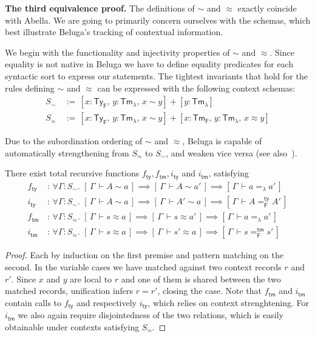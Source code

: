 \documentclass[a4paper,UKenglish]{lipics-v2016}
\newcommand{\ms}{\,}
\newcommand{\mrel}[1]{\mathrel{\ms #1 \ms}}
\newcommand{\OF}{\mrel{:}}
\newcommand{\mAll}[1]{\ensuremath{\forall} #1.\ms\ms}
\newcommand{\eqdef}{\mrel{:=}}
\newcommand{\TyF}{\ensuremath{\mathsf{Ty_{F}}}}
\newcommand{\TmF}{\ensuremath{\mathsf{Tm_{F}}}}
\newcommand{\TmL}{\ensuremath{\mathsf{Tm_{\lambda}}}}
\newcommand{\ty}{\mathsf{ty}}
\newcommand{\tm}{\mathsf{tm}}
\newcommand{\of}{\ensuremath{\!:\!}}
\newcommand{\tyr}{\mathrel{\sim}}
\newcommand{\tmr}{\mathrel{\approx}}
\newcommand{\bc}[2]{\ensuremath{[\,#1\,\vdash #2\,]}}
\newcommand{\sof}{\ensuremath{\!:}}
\newcommand{\ssep}{\ensuremath{,\ms}}
\theoremstyle{plain}
\begin{document}
{\bf The third equivalence proof.}
The definitions of $\tyr$ and $\tmr$ exactly coincide with Abella.
We are going to primarily concern ourselves with the schemas, which best illustrate Beluga's tracking of contextual information.

We begin with the functionality and injectivity properties of $\tyr$ and $\tmr$.
Since equality is not native in Beluga we have to define equality predicates for each syntactic sort to express our statements. The tightest invariants that hold for the rules defining $\tyr$ and $\tmr$ can be expressed with the following context schemas:
\begin{align*}
  S_{\tyr} &\eqdef [x\sof\TyF \ssep y\sof\TmL \ssep x \tyr y] + [y\sof\TmL]\\
  S_{\tmr} &\eqdef [x\sof\TyF \ssep y\sof\TmL \ssep x \tyr y] + [x\sof\TmF \ssep y\sof\TmL \ssep x \tmr y]
\end{align*}

Due to the subordination ordering of $\tyr$ and $\tmr$, Beluga is capable of automatically strengthening from $S_{\tmr}$ to $S_{\tyr}$, and weaken vice versa (see also~\cite{Virga99phd}).
\begin{lemma}
  There exist total recursive functions $f_{\ty}, f_{\tm}, i_{\ty}$ and $i_{\tm}$, satisfying
  \begin{align*}
    f_{\ty} &\OF  \mAll{\Gamma \of S_{\tyr}} \bc{\Gamma}{A \tyr a} \implies \bc{\Gamma}{A \tyr a'} \implies \bc{\Gamma}{a =_{\lambda} a'}\\
    i_{\ty} &\OF  \mAll{\Gamma \of S_{\tyr}} \bc{\Gamma}{A \tyr a} \implies \bc{\Gamma}{A' \tyr a} \implies \bc{\Gamma}{A =^{\ty}_{\mathsf{F}} A'}\\
    f_{\tm} &\OF  \mAll{\Gamma \of S_{\tmr}} \bc{\Gamma}{s \tmr a} \implies \bc{\Gamma}{s \tmr a'} \implies \bc{\Gamma}{a =_{\lambda} a'}\\
    i_{\tm} &\OF  \mAll{\Gamma \of S_{\tmr}} \bc{\Gamma}{s \tmr a} \implies \bc{\Gamma}{s' \tmr a} \implies \bc{\Gamma}{s =^{\tm}_{\mathsf{F}} s'}
\end{align*}
\end{lemma}
\begin{proof}
  Each by induction on the first premise and pattern matching on the second.
  In the variable cases we have matched against two context records $r$ and $r'$.
  Since $x$ and $y$ are local to $r$ and one of them is shared between the two matched records, unification infers $r = r'$, closing the case.
  Note that $f_{\tm}$ and $i_{\tm}$ contain calls to $f_{\ty}$ and respectively $i_{\ty}$, which relies on context strenghtening.
  For $i_{\tm}$ we also again require disjointedness of the two relations, which is easily obtainable under contexts satisfying $S_{\tmr}$.
\end{proof}
\end{document}
